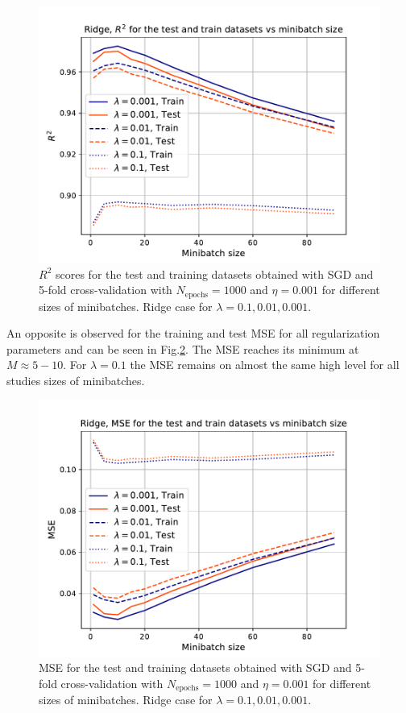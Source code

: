 \documentclass{emulateapj}
\begin{document}
\begin{figure}[h]
    \centering
    \includegraphics[width=.49\textwidth]{Figures/Ridge_R2_minibatch.pdf}
    \caption{$R^2$ scores for the test and training datasets obtained with SGD and 5-fold cross-validation with $N_{\mathrm{epochs}}=1000$ and $\eta=0.001$ for different sizes of minibatches. Ridge case for $\lambda=0.1,0.01,0.001$.}
    \label{fig: R2_Ridge_minibatch}
\end{figure}

An opposite is observed for the training and test MSE for all regularization parameters and can be seen in Fig.\ref{fig: MSE_Ridge_minibatch}. The MSE reaches its minimum at $M\approx5-10$. For $\lambda=0.1$ the MSE remains on almost the same high level for all studies sizes of minibatches.

\begin{figure}[h]
    \centering
    \includegraphics[width=.49\textwidth]{Figures/Ridge_MSE_minibatch.pdf}
    \caption{MSE for the test and training datasets obtained with SGD and 5-fold cross-validation with $N_{\mathrm{epochs}}=1000$ and $\eta=0.001$ for different sizes of minibatches. Ridge case for $\lambda=0.1,0.01,0.001$.}
    \label{fig: MSE_Ridge_minibatch}
\end{figure}
\end{document}
